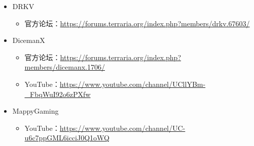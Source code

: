 \begin{itemize}
\begin{itemize}
\end{itemize}
\item DRKV
\begin{itemize}
    \item 官方论坛：\url{https://forums.terraria.org/index.php?members/drkv.67603/}
\end{itemize}
\item DicemanX
\begin{itemize}
    \item 官方论坛：\url{https://forums.terraria.org/index.php?members/dicemanx.1706/}
    \item YouTube：\url{https://www.youtube.com/channel/UCllYBm-_FbqWuI92o6zPXfw}
\end{itemize}
\item MappyGaming
\begin{itemize}
    \item YouTube：\url{https://www.youtube.com/channel/UC-u6c7ppGML6icciJ0Q1oWQ}
\end{itemize}
\end{itemize}